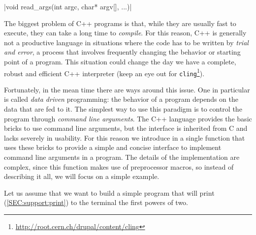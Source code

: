 \item \cppinline|void read_args(int argc, char* argv[], ...)| 

The biggest problem of C++ programs is that, while they are usually fast to execute, they can take a long time to \emph{compile}. For this reason, C++ is generally not a productive language in situations where the code has to be written by \emph{trial and error}, a process that involves frequently changing the behavior or starting point of a program. This situation could change the day we have a complete, robust and efficient C++ interpreter (keep an eye out for \texttt{cling}\footnote{\url{http://root.cern.ch/drupal/content/cling}}).

Fortunately, in the mean time there are ways around this issue. One in particular is called \emph{data driven} programming: the behavior of a program depends on the data that are fed to it. The simplest way to use this paradigm is to control the program through \emph{command line arguments}. The C++ language provides the basic bricks to use command line arguments, but the interface is inherited from C and lacks severely in usability. For this reason we introduce in \phypp a single function  that uses these bricks to provide a simple and concise interface to implement command line arguments in a program. The details of the implementation are complex, since this function makes use of preprocessor macros, so instead of describing it all, we will focus on a simple example.

Let us assume that we want to build a simple program that will print (\ref{SEC:support:print}) to the terminal the first  powers of two.

